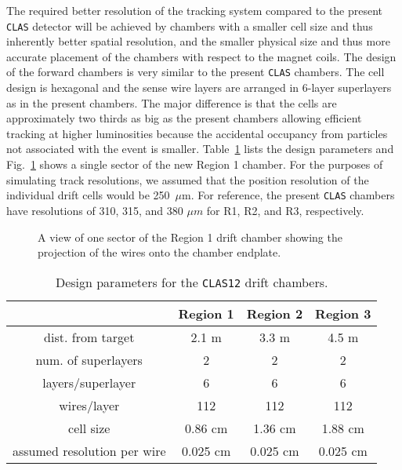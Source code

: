 The required better resolution of the tracking system compared to the 
present {\tt CLAS} detector will be achieved by chambers with a smaller 
cell size and thus inherently better spatial resolution, and the smaller 
physical size and thus more accurate placement of the chambers with respect 
to the magnet coils.  The design of the forward chambers is very similar to 
the present {\tt CLAS} chambers.  The cell design is hexagonal and the sense 
wire layers are arranged in 6-layer superlayers as in the present chambers. 
The major difference is that the cells are approximately two thirds as big 
as the present chambers allowing efficient tracking at higher luminosities 
because the accidental occupancy from particles not associated with the 
event is smaller. Table~\ref{fwd-dc-design-parms} lists the design 
parameters and Fig.~\ref{fwddc} shows a single sector of the new Region 1
chamber.  For the purposes of simulating track resolutions, we assumed that 
the position resolution of the individual drift cells would be 250~$\mu$m.  
For reference, the present {\tt CLAS} chambers have resolutions of 310, 315,
and 380 $\mu m$ for R1, R2, and R3, respectively.

\begin{figure}[htbp]
\vspace{9.0cm}
\caption{\small{A view of one sector of the Region 1 drift chamber 
showing the projection of the wires onto the chamber endplate.}}
\label{fwddc}
\end{figure}

\begin{table}[htbp]
\begin{center}
\begin{tabular} {||c|c|c|c||} \hline \hline
&{\bf Region 1}      &  {\bf Region 2} & {\bf Region 3}\\ \hline
dist. from target    & 2.1 m & 3.3 m   & 4.5 m \\ \hline
num. of superlayers  & 2 & 2   & 2 \\ \hline
layers/superlayer    & 6 & 6   & 6 \\ \hline
wires/layer          & 112 & 112   & 112 \\ \hline
cell size            & 0.86 cm & 1.36 cm   & 1.88 cm \\ \hline
assumed resolution per wire  & 0.025 cm & 0.025 cm   & 0.025 cm \\ \hline
\end{tabular}
\caption{\small{Design parameters for the {\tt CLAS12} drift chambers.}}
\label{fwd-dc-design-parms}
\end{center}
\end{table}

